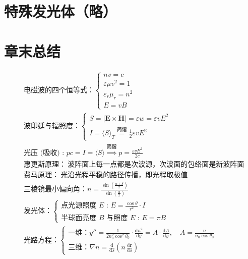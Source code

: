 \documentclass[UTF8]{report}
\theoremstyle{MyLineTheoremStyle} %
\theoremstyle{MyBlockTheoremStyle} %
\theoremstyle{MySubsubsectionStyle} %
\begin{document}
\section{特殊发光体（略）}

\section{章末总结}

\begin{align}
&
\text{电磁波的四个恒等式：} \begin{cases}
    nv = c \\ 
    \varepsilon \mu v^2 = 1 \\ 
    \varepsilon_r \mu_r = n^2 \\ 
    E = vB
\end{cases} 
\\ &
\text{波印廷与辐照度：} \begin{cases}
    S = | \boldsymbol{E}\times \boldsymbol{H} | = \varepsilon w = \varepsilon v E^2 \\ 
    I = \langle  S  \rangle_T \overset{\text{简谐}}{=} \frac{1}{2}\varepsilon v E^2 
\end{cases}
\\ &
\text{光压 (吸收) : \ } pc = I = \langle S \rangle \overset{\text{简谐}}{\Longrightarrow} p = \frac{\varepsilon v E^2}{2c}
\\ &
\text{惠更斯原理：} \ \text{波阵面上每一点都是次波源，次波面的包络面是新波阵面}
\\ &
\text{费马原理：} \ \text{光沿光程平稳的路径传播，即光程取极值}
\\ &
\text{三棱镜最小偏向角：} n = \frac{\sin \left(\frac{\alpha + \delta}{2}\right)}{\sin \left(\frac{\alpha}{2}\right)} 
\\ &
\text{发光体：}
\begin{cases}
    \text{点光源照度 $E$ :\ }E = \frac{\cos \theta}{r^2}\cdot I \\ 
    \text{半球面亮度 $B$ 与照度 $E$ :\ } E = \pi B
\end{cases} 
\\ &
\text{光路方程：}
\begin{cases}
    \text{一维：} y'' = \frac{1}{2n_0^2\cos^2 \theta_0}\cdot \frac{\mathrm{d} n^2 }{\mathrm{d} y } = A\cdot \frac{\mathrm{d} A }{\mathrm{d} y },\quad A = \frac{n}{n_0\cos \theta_0} \\ 
    \text{三维：} \nabla n = \frac{\mathrm{d}  }{\mathrm{d} s }\left(n\, \frac{\mathrm{d} \boldsymbol{r} }{\mathrm{d} s }\right)

\end{cases}
\end{align}
\end{document}
